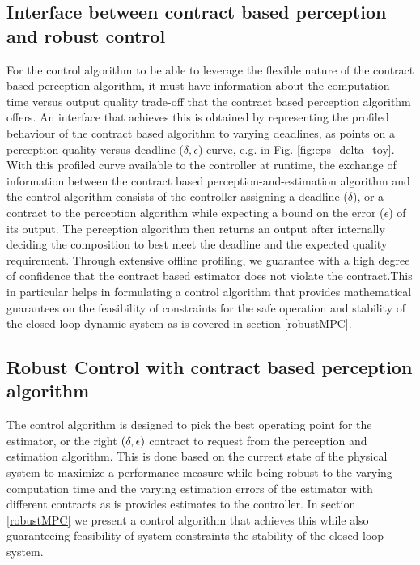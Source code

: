 

\subsection{Interface between contract based perception and robust control}

For the control algorithm to be able to leverage the flexible nature of the contract based perception algorithm, it must have information about the computation time versus output quality trade-off that the contract based perception algorithm offers. An interface that achieves this is obtained by representing the profiled behaviour of the contract based algorithm to varying deadlines, as points on a perception quality versus deadline ($\delta, \epsilon$) curve, e.g. in Fig. \ref{fig:eps_delta_toy}.
With this profiled curve available to the controller at runtime, the exchange of information between the contract based perception-and-estimation algorithm and the control algorithm consists of the controller assigning a deadline ($\delta$), or a contract to the perception algorithm while expecting a bound on the error ($\epsilon$) of its output. The perception algorithm then returns an output after internally deciding the composition to best meet the deadline and the expected quality requirement. 
Through extensive offline profiling, we guarantee with a high degree of confidence that the contract based estimator does not violate the contract.This in particular helps in formulating a control algorithm that provides mathematical guarantees on the feasibility of constraints for the safe operation and stability of the closed loop dynamic system as is covered in section \ref{robustMPC}.

\subsection{Robust Control with contract based perception algorithm}

The control algorithm is designed to pick the best operating point for the estimator, or the right $(\delta,\epsilon)$ contract to request from the perception and estimation algorithm. This is done based on the current state of the physical system to maximize a performance measure while being robust to the varying computation time and the varying estimation errors of the estimator with different contracts as is provides estimates to the controller. In section \ref{robustMPC} we present a control algorithm that achieves this while also guaranteeing feasibility of system constraints the stability of the closed loop system.






